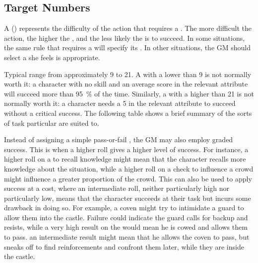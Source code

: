 \subsection{Target Numbers}

A {\targetnumber} ({\tn}) represents the difficulty of the action that requires a {\test}.
The more difficult the action, the higher the {\targetnumber}, and the less likely the {\test} is to succeed.
In some situations, the same rule that requires a {\test} will specify its {\tn}.
In other situations, the GM should select a {\tn} she feels is appropriate.

Typical {\tns} range from approximately 9 to 21.
A {\test} with a {\tn} lower than 9 is not normally worth it: a character with no skill and an average score in the relevant attribute will succeed more than \SI{95}{\percent} of the time.
Similarly, a {\test} with a {\tn} higher than 21 is not normally worth it: a character needs a 5 in the relevant attribute to succeed without a critical success.
The following table shows a brief summary of the sorts of task particular {\tns} are suited to.


Instead of assigning a simple pass-or-fail {\tn}, the GM may also employ graded success.
This is when a higher roll gives a higher level of success.
For instance, a higher roll on a {\test} to recall knowledge might mean that the character recalls more knowledge about the situation, while a higher roll on a check to influence a crowd might influence a greater proportion of the crowd.
This can also be used to apply success at a cost, where an intermediate roll, neither particularly high nor particularly low, means that the character succeeds at their task but incurs some drawback in doing so.
For example, a coven might try to intimidate a guard to allow them into the castle.
Failure could indicate the guard calls for backup and resists, while a very high result on the {\test} would mean he is cowed and allows them to pass.
an intermediate result might mean that he allows the coven to pass, but sneaks off to find reinforcements and confront them later, while they are inside the castle.

